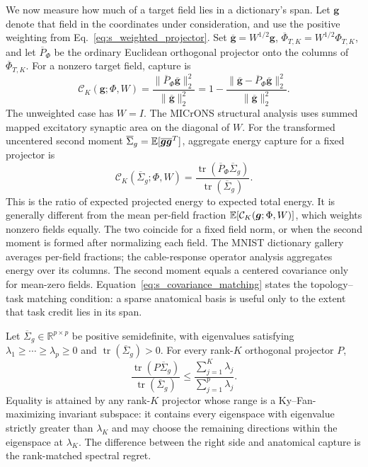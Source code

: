 We now measure how much of a target field lies in a dictionary's span. Let
$\bm g$ denote that field in the coordinates under consideration, and use
the positive weighting from Eq.~\ref{eq:s_weighted_projector}. Set
$\overline{\bm g}=W^{1/2}\bm g$,
$\overline\Phi_{T,K}=W^{1/2}\Phi_{T,K}$, and let
$\overline P_\Phi$ be the ordinary Euclidean orthogonal projector onto the
columns of $\overline\Phi_{T,K}$. For a nonzero target field, capture is
\begin{equation}
\mathcal C_K(\bm g;\Phi,W)
=\frac{\lVert\overline P_\Phi\overline{\bm g}\rVert_2^2}
{\lVert\overline{\bm g}\rVert_2^2}
=1-\frac{\lVert\overline{\bm g}-\overline P_\Phi\overline{\bm g}\rVert_2^2}
{\lVert\overline{\bm g}\rVert_2^2}.
\label{eq:s_capture}
\end{equation}
The unweighted case has $W=I$. The MICrONS structural analysis uses summed
mapped excitatory synaptic area on the diagonal of $W$. For the transformed
uncentered second moment
$\overline\Sigma_g=\mathbb{E}[\overline{\bm g}\overline{\bm g}^{T}]$,
aggregate energy capture for a fixed projector is
\begin{equation}
\mathcal C_K(\overline\Sigma_g;\Phi,W)
=\frac{\operatorname{tr}(\overline P_\Phi\overline\Sigma_g)}
{\operatorname{tr}(\overline\Sigma_g)}.
\label{eq:s_covariance_matching}
\end{equation}
This is the ratio of expected projected energy to expected total energy. It
is generally different from the mean per-field fraction
$\mathbb{E}[\mathcal C_K(\bm g;\Phi,W)]$, which weights nonzero fields equally.
The two coincide for a fixed field norm, or when the second moment is formed
after normalizing each field. The MNIST dictionary gallery averages per-field
fractions; the cable-response operator analysis aggregates energy over its
columns. The second moment equals a centered covariance only for mean-zero
fields.
Equation~\ref{eq:s_covariance_matching} states the topology--task matching
condition: a sparse anatomical basis is useful only to the extent that task
credit lies in its span.

\begin{proposition}
Let $\overline\Sigma_g\in\mathbb R^{p\times p}$ be positive semidefinite,
with eigenvalues satisfying
$\lambda_1\geq\cdots\geq\lambda_p\geq0$ and
$\operatorname{tr}(\overline\Sigma_g)>0$. For every rank-$K$ orthogonal
projector $P$,
\begin{equation}
\frac{\operatorname{tr}(P\overline\Sigma_g)}
{\operatorname{tr}(\overline\Sigma_g)}
\leq
\frac{\sum_{j=1}^{K}\lambda_j}{\sum_{j=1}^{p}\lambda_j}.
\label{eq:s_ky_fan_capture}
\end{equation}
Equality is attained by any rank-$K$ projector whose range is a
Ky--Fan-maximizing invariant subspace: it contains every eigenspace with
eigenvalue strictly greater than $\lambda_K$ and may choose the remaining
directions within the eigenspace at $\lambda_K$.
The difference between the right side and anatomical capture is the
rank-matched spectral regret.
\end{proposition}

